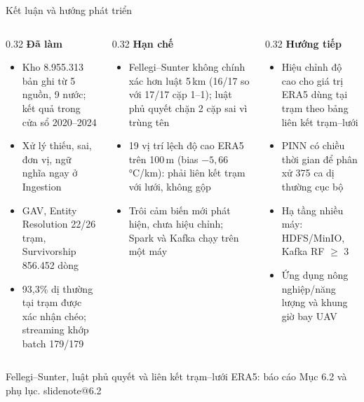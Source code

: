\documentclass[t,aspectratio=169,12pt]{beamer}
\makeatletter
\newcommand{\slidenote}[1]{\ifcsname slidenote@#1\endcsname\note{\csname slidenote@#1\endcsname}\fi}
\newcommand{\nguon}[1]{\vskip1mm{\scriptsize\color{mutedgray}#1}}
\makeatother
\begin{document}
\begin{frame}{Kết luận và hướng phát triển}
  \vskip1mm
  \begin{columns}[t]
    \begin{column}{0.32\textwidth}
      {\bfseries\color{hustblue}Đã làm}
      \begin{itemize}\scriptsize\setlength\itemsep{0.8mm}
        \item Kho 8.955.313 bản ghi từ 5 nguồn, 9 nước; kết quả trong cửa sổ 2020--2024
        \item Xử lý thiếu, sai, đơn vị, ngữ nghĩa ngay ở Ingestion
        \item GAV, Entity Resolution 22/26 trạm, Survivorship 856.452 dòng
        \item 93,3\% dị thường tại trạm được xác nhận chéo; streaming khớp batch 179/179
      \end{itemize}
    \end{column}
    \begin{column}{0.32\textwidth}
      {\bfseries\color{hustblue}Hạn chế}
      \begin{itemize}\scriptsize\setlength\itemsep{0.8mm}
        \item Fellegi--Sunter không chính xác hơn luật 5\,km (16/17 so với 17/17 cặp 1--1); luật phủ quyết chặn 2 cặp sai vì trùng tên
        \item 19 vị trí lệch độ cao ERA5 trên 100\,m (bias $-5{,}66$\,°C/km): phải liên kết trạm với lưới, không gộp
        \item Trôi cảm biến mới phát hiện, chưa hiệu chỉnh; Spark và Kafka chạy trên một máy
      \end{itemize}
    \end{column}
    \begin{column}{0.32\textwidth}
      {\bfseries\color{hustblue}Hướng tiếp}
      \begin{itemize}\scriptsize\setlength\itemsep{0.8mm}
        \item Hiệu chỉnh độ cao cho giá trị ERA5 dùng tại trạm theo bảng liên kết trạm--lưới
        \item PINN có chiều thời gian để phân xử 375 ca dị thường cục bộ
        \item Hạ tầng nhiều máy: HDFS/MinIO, Kafka RF $\geq$ 3
        \item Ứng dụng nông nghiệp/năng lượng và khung giờ bay UAV
      \end{itemize}
    \end{column}
  \end{columns}
  \nguon{Fellegi--Sunter, luật phủ quyết và liên kết trạm--lưới ERA5: báo cáo Mục 6.2 và phụ lục.}
  \slidenote{6.2}
\end{frame}
\end{document}
